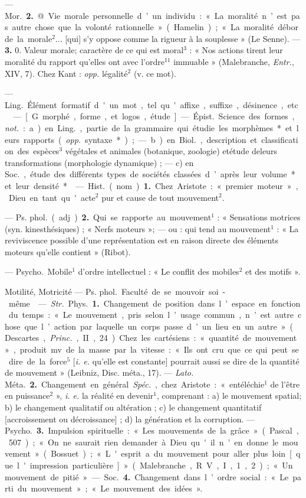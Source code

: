 \begin{itemize}[leftmargin=1cm, label=, itemsep=1pt]
— \si{Mor.} {\bf 2.} @. Vie morale personnelle d’un individu : « La moralité n’est pas autre chose que la volonté rationnelle » (Hamelin) ; « La
moralité déborde la morale$^2$... [qui]
s’y oppose comme la rigueur à la
souplesse » (Le Senne). — {\bf 3.} 0.
Valeur morale; caractère de ce qui
est moral$^3$ : « Nos actions tirent leur
moralité du rapport qu’elles ont
avec l’ordre$^{11}$ immuable » (Malebranche, {\it Entr.}, XIV, 7). Chez Kant :
{\it opp.} légalité$^2$ (v. ce mot).

 — \si{Ling.} Élément formatif
d'un mot, tel qu'affixe, suffixe,
désinence, etc.

 — [G. morphé, forme, et
logos, étude] — \si{Épist.} Science des
formes, {\it not.} : a) en \si{Ling.}, partie de
la grammaire qui étudie les morphèmes* et leurs rapports ({\it opp.}
syntaxe*) ; — b) en \si{Biol.}, description et classification des espèces$^3$
végétales et animales (botanique,
zoologie) etétude deleurs transformations (morphologie dynamique) ; —
c) en \si{Soc.}, étude des différents types
de sociétés classées d’après leur
volume* et leur densité*.

 — \si{Hist.} (nom). {\bf 1.} Chez Aristote : « premier moteur », Dieu en
tant qu'acte$^2$ pur et cause de tout
mouvement$^2$.

— \si{Ps. phol.} (adj.). {\bf 2.} Qui se rapporte au mouvement$^1$ : « Sensations
motrices (syn. kinesthésiques) ;
« Nerfs moteurs »; — ou : qui tend
au mouvement$^1$ : « La reviviscence
possible d’une représentation est
en raison directe des éléments moteurs qu’elle contient » (Ribot).

 — \si{Psycho.} Mobile$^1$ d'ordre intellectuel : « Le conflit des mobiles$^2$ et
des motifs ».

Motilité, Motricité\ib{} — \si{Ps. phol.} Faculté
de se mouvoir soi-même.

 — {\it Str.} \si{Phys.} {\bf 1.} Changement de position dans l’espace en
fonction du temps : « Le mouvement,
pris selon l’usage commun, n’est
autre chose que l’action par laquelle
un corps passe d’un lieu en un
autre » (Descartes, {\it Princ.}, II, 24).
Chez les cartésiens : « quantité de
mouvement », produit mv de la
masse par la vitesse : « Ils ont cru que
ce qui peut se dire de la force$^5$ [{\it i. e.}
qu’elle est constante] pourrait aussi
se dire de la quantité de mouvement » (Leibniz, Disc. méta., 17).
— {\it Lato.} \si{Méta.} {\bf 2.} Changement
en général. {\it Spéc.}, chez Aristote :
« entéléchie$^1$ de l’être en puissance$^2$ »,
{\it i. e.} la réalité en devenir$^1$, comprenant : a) le mouvement spatial;
b) le changement qualitatif ou altération ; c) le changement quantitatif
[accroissement ou décroissance] ;
d) la génération et la corruption.
— \si{Psycho.} {\bf 3.} Impulsion spirituelle :
« Les mouvements de la grâce »
(Pascal, 507) ; « On ne saurait rien
demander à Dieu qu'il n’en donne
le mouvement » (Bossuet) ; « L'esprit
a du mouvement pour aller plus
loin [que l'impression particulière] »
(Malebranche, R. V., I, 1, 2) ; « Un
mouvement de pitié » — \si{Soc.} {\bf 4.}
Changement dans l’ordre social :
« Le parti du mouvement » ; « Le
mouvement des idées ».


\end{itemize}
